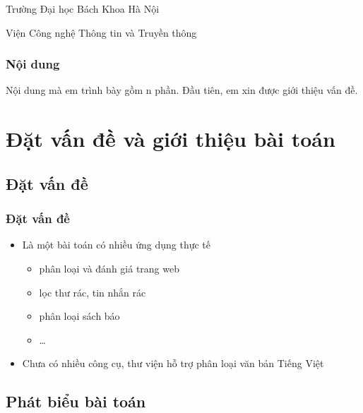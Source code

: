 
\begin{frame}
  \centerline{Trường Đại học Bách Khoa Hà Nội}
  \centerline{Viện Công nghệ Thông tin và Truyền thông}
  \titlepage %
\end{frame}

\begin{frame}
  \frametitle{Nội dung}
  \tableofcontents
  \note
  {
    Nội dung mà em trình bày gồm n phần.
    Đầu tiên, em xin được giới thiệu vấn đề.
  }
\end{frame}

\section{Đặt vấn đề và giới thiệu bài toán}

\subsection{Đặt vấn đề}

\begin{frame}
  \frametitle{Đặt vấn đề}
  \begin{itemize}[<+->]
  \item Là một bài toán có nhiều ứng dụng thực tế
    \begin{itemize}
      \item phân loại và đánh giá trang web
      \item lọc thư rác, tin nhắn rác
      \item phân loại sách báo
      \item \ldots
    \end{itemize}
  \item Chưa có nhiều công cụ, thư viện hỗ trợ phân loại văn bản Tiếng Việt
  \end{itemize}
\end{frame}

\subsection{Phát biểu bài toán}

